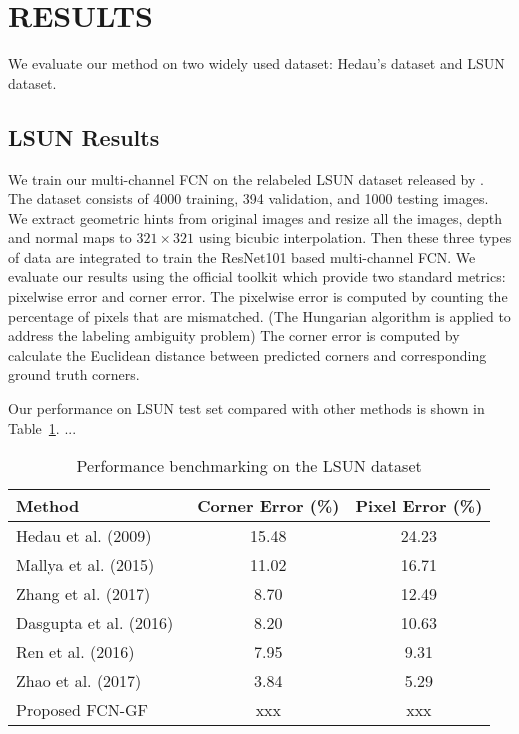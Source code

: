 \section{RESULTS}
\label{sec:Res}

We evaluate our method on two widely used dataset: Hedau's dataset \cite{hedau2009recovering} and LSUN dataset.
\subsection{LSUN Results}
\label{sec:LSUN}
We train our multi-channel FCN on the relabeled LSUN dataset released by \cite{ren2016coarse}. The dataset consists of 4000 training, 394 validation, and 1000 testing images. We extract geometric hints from original images and resize all the images, depth and normal maps to $321\times321$ using bicubic interpolation. Then these three types of data are integrated to train the ResNet101 based multi-channel FCN. We evaluate our results using the official toolkit which provide two standard metrics: pixelwise error and corner error. The pixelwise error is computed by counting the percentage of pixels that are mismatched. (The Hungarian algorithm is applied to address the labeling ambiguity problem) The corner error is computed by calculate the Euclidean distance between predicted corners and corresponding ground truth corners.

Our performance on LSUN test set compared with other methods is shown in Table~\ref{table:comparison-lsun}. ... 

\begin{table}
	\centering 
	\caption{Performance benchmarking on the LSUN dataset}
	\label{table:comparison-lsun}
	\begin{tabular}{l|c|c}
		\hline 
		Method & Corner Error (\%) & Pixel Error (\%) \\
		\hline
		Hedau et al. (2009)~\cite{hedau2009recovering} & 15.48 & 24.23 \\
		Mallya et al. (2015)~\cite{mallya2015learning} & 11.02 & 16.71 \\
		Zhang et al. (2017)~\cite{zhang2017learning} & 8.70 & 12.49 \\
		Dasgupta et al. (2016)~\cite{dasgupta2016delay} & 8.20 & 10.63 \\
		Ren et al. (2016)~\cite{ren2016three} & 7.95 & 9.31 \\
		Zhao et al. (2017)~\cite{zhao2017physics} & 3.84 & 5.29 \\
		Proposed FCN-GF & xxx & xxx \\
		\hline
	\end{tabular}
\end{table}

